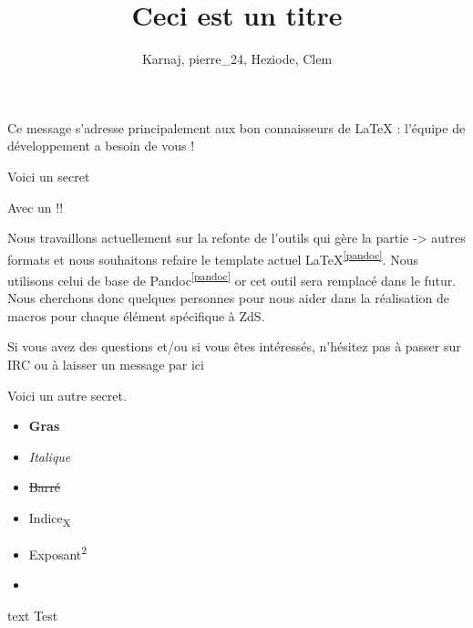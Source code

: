 \documentclass[small]{zmdocumentdd}
\title{Ceci est un titre}
\author{Karnaj, pierre\_24, Heziode, Clem}
\begin{document}
\maketitle
\tableofcontents
\newpage

\levelOneIntroduction

Ce message s’adresse principalement aux bon connaisseurs de LaTeX : l’équipe de développement a besoin de vous ! 

\begin{Spoiler}
Voici un secret

Avec un !!
\end{Spoiler}


Nous travaillons actuellement sur la refonte de l’outils qui gère la partie  -> autres formats et nous souhaitons refaire le template actuel LaTeX\textsuperscript{\ref{pandoc}}. Nous utilisons celui de base de Pandoc\textsuperscript{\ref{pandoc}} or cet outil sera remplacé dans le futur. Nous cherchons donc quelques personnes pour nous aider dans la réalisation de macros pour chaque élément spécifique à ZdS.


Si vous avez des questions et/ou si vous êtes intéressés, n’hésitez pas à passer sur IRC ou à laisser un message par ici 

\begin{Spoiler}
Voici un autre secret.
\end{Spoiler}


\begin{itemize}
\item \textbf{Gras}
\item \textit{Italique}
\item \sout{Barré}
\item Indice\textsubscript{X}
\item Exposant\textsuperscript{2}
\item {}
\end{itemize}

\begin{Spoiler}
\begin{CodeBlock}{text}
Test
\end{CodeBlock}
\end{Spoiler}
\end{document}
